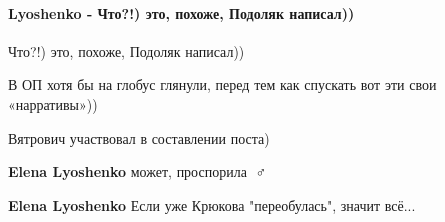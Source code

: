  
 
 
 
 
\paragraph{Lyoshenko - Что?!) это, похоже, Подоляк написал))}

\begin{itemize}
 
Что?!) это, похоже, Подоляк написал))

В ОП хотя бы на глобус глянули, перед тем как спускать вот эти свои «нарративы»))

\begin{itemize}
 
Вятрович участвовал в составлении поста)

 
\textbf{Elena Lyoshenko} может, проспорила 🤷♂️

 
\textbf{Elena Lyoshenko} Если уже Крюкова "переобулась", значит всё...


 

\end{itemize}
\end{itemize}
